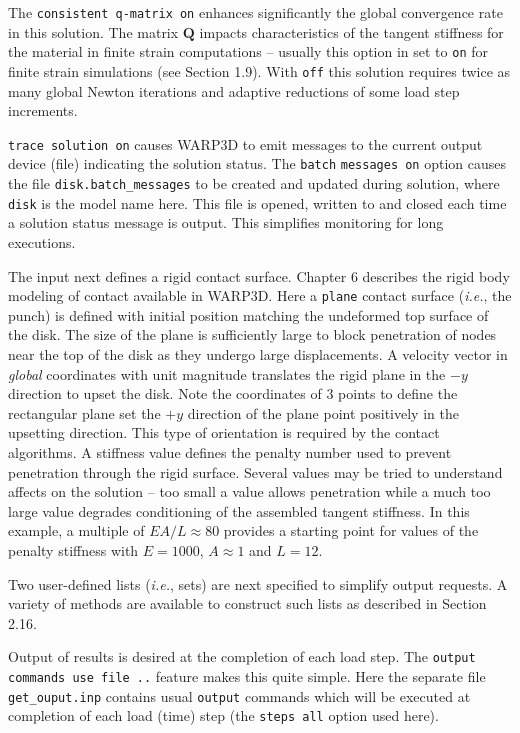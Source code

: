 \documentclass[11pt]{report}
\numberwithin{equation}{section}
\newcommand{\ttt} {\texttt}  %
\newcommand{\ie}{\emph{i.e.},\xspace}
\newcommand{\ti}{\emph}
\begin{document}
{The \ttt{consistent q-matrix on} enhances significantly the global convergence
rate in this solution. The matrix $\mathbf{Q}$ impacts characteristics of 
the tangent stiffness for the material in finite strain
computations -- usually this option in set to \ttt{on} for finite strain 
simulations (see Section 1.9). With \ttt{off} this
solution requires twice as many global Newton iterations and adaptive 
reductions of some load step increments.

\ttt{trace solution on} causes WARP3D to emit messages to the current 
output device (file) indicating the solution 
status. The \ttt{batch} \ttt{messages on} option causes the file \ttt{disk.}\ttt{batch\_messages} 
to be created and updated during 
solution, where \ttt{disk} is the model name here. This file is opened, 
written to and closed each time a 
solution status message is output. This simplifies monitoring for long executions.

The input next defines a rigid contact surface.
Chapter 6 describes the rigid body modeling of contact available in WARP3D. Here a \ttt{plane} contact
surface (\ie the punch)
is defined with initial position matching the undeformed top surface of the disk.  The size of the plane
is sufficiently large to block penetration of nodes near the top of the disk as they undergo large displacements.
A velocity vector in \ti{global}
coordinates with unit magnitude
translates the rigid plane in the $-y$ direction to upset the disk. Note the coordinates of 3 points
to define the rectangular plane set the $+y$ direction of the plane point positively in the upsetting
direction. This type of orientation is required by the contact algorithms. A stiffness value defines the penalty number
used to prevent penetration through the rigid surface. Several values may be tried to understand
affects on the solution -- too small a value allows penetration while a much too large value
degrades conditioning of the assembled tangent stiffness. In this example, 
a multiple of $E A/ L\approx 80$ provides a 
starting point for values of the penalty stiffness with $E=1000$,
$A\approx 1$ and $L=12$.

Two user-defined lists (\ie sets) are next specified to simplify output requests. A variety of methods
are available to construct such lists as described in Section 2.16.

Output of results is desired at the completion of each load step. The \ttt{output commands use file ..}
feature makes this quite simple. Here the separate file \ttt{get\_ouput.inp} contains usual
\ttt{output} commands which will be executed at completion of each load (time) step (the \ttt{steps
all} option used here).

}
\end{document}
